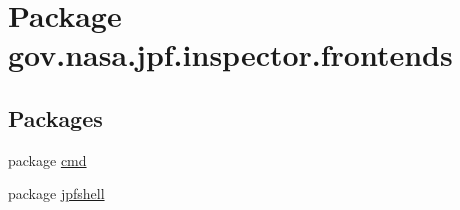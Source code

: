 \hypertarget{namespacegov_1_1nasa_1_1jpf_1_1inspector_1_1frontends}{}\section{Package gov.\+nasa.\+jpf.\+inspector.\+frontends}
\label{namespacegov_1_1nasa_1_1jpf_1_1inspector_1_1frontends}
\subsection*{Packages}
\begin{DoxyCompactItemize}
\item 
package \hyperlink{namespacegov_1_1nasa_1_1jpf_1_1inspector_1_1frontends_1_1cmd}{cmd}
\item 
package \hyperlink{namespacegov_1_1nasa_1_1jpf_1_1inspector_1_1frontends_1_1jpfshell}{jpfshell}
\end{DoxyCompactItemize}
